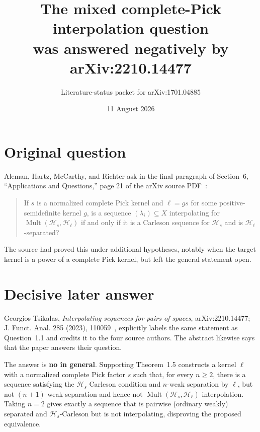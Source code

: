 \documentclass[11pt]{article}
\title{The mixed complete-Pick interpolation question\\was answered negatively by arXiv:2210.14477}
\author{Literature-status packet for arXiv:1701.04885}
\date{11 August 2026}
\newcommand{\Hs}{\mathcal H_s}
\newcommand{\Hl}{\mathcal H_\ell}
\newcommand{\Mult}{\operatorname{Mult}}
\begin{document}
\maketitle

\begin{center}
\end{center}

\section*{Original question}

Aleman, Hartz, McCarthy, and Richter ask in the final paragraph of
Section~6, ``Applications and Questions,'' page 21 of the arXiv source
PDF~\cite{AHMR}:

\begin{quote}
If $s$ is a normalized complete Pick kernel and $\ell=gs$ for some
positive-semidefinite kernel $g$, is a sequence $(\lambda_i)\subseteq X$
interpolating for $\Mult(\Hs,\Hl)$ if and only if it is a Carleson sequence
for $\Hs$ and is $\Hl$-separated?
\end{quote}

The source had proved this under additional hypotheses, notably when the
target kernel is a power of a complete Pick kernel, but left the general
statement open.

\section*{Decisive later answer}

Georgios Tsikalas, \emph{Interpolating sequences for pairs of spaces},
arXiv:2210.14477; J. Funct. Anal. 285 (2023), 110059~\cite{Tsikalas}, explicitly
labels the same statement as Question~1.1 and credits it to the four source
authors.  The abstract likewise says that the paper answers their question.

The answer is \textbf{no in general}.  Supporting Theorem~1.5 constructs a
kernel $\ell$ with a normalized complete Pick factor $s$ such that, for every
$n\ge2$, there is a sequence satisfying the $\Hs$ Carleson condition and
$n$-weak separation by $\ell$, but not $(n+1)$-weak separation and hence not
$\Mult(\Hs,\Hl)$ interpolation.  Taking $n=2$ gives exactly a sequence that is
pairwise (ordinary weakly) separated and $\Hs$-Carleson but is not
interpolating, disproving the proposed equivalence.
\end{document}
